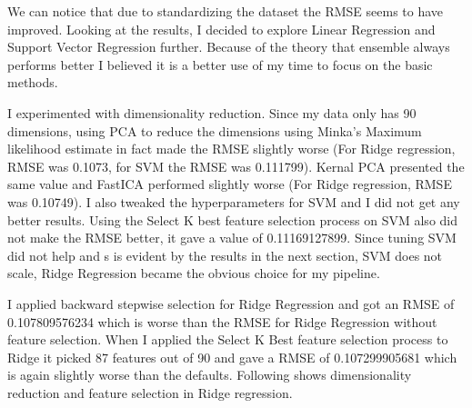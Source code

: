 \documentclass{article} %
\begin{document}
\begin{table}[H]
	\caption{Results after pre-processing - Sampled data set}
	\label{preproc}
	\begin{center}
	\end{center}
\end{table}

We can notice that due to standardizing the dataset the RMSE seems to have improved. Looking at the results, I decided to explore Linear Regression and Support Vector Regression further. Because of the theory that ensemble always performs better I believed it is a better use of my time to focus on the basic methods. 

I experimented with dimensionality reduction. Since my data only has 90 dimensions, using PCA to reduce the dimensions using Minka's Maximum likelihood estimate \cite{minka} in fact made the RMSE slightly worse (For Ridge regression, RMSE was 0.1073, for SVM the RMSE was 0.111799). Kernal PCA presented the same value and FastICA performed slightly worse (For Ridge regression, RMSE was 0.10749). I also tweaked the hyperparameters for SVM and I did not get any better results. Using the Select K best feature selection process on SVM also did not make the RMSE better, it gave a value of 0.11169127899. Since tuning SVM did not help and s is evident by the results in the next section, SVM does not scale, Ridge Regression became the obvious choice for my pipeline. 

I applied backward stepwise selection for Ridge Regression and got an RMSE of 0.107809576234 which is worse than the RMSE for Ridge Regression without feature selection. When I applied the Select K Best feature selection process to Ridge it picked 87 features out of 90 and gave a RMSE of 0.107299905681 which is again slightly worse than the defaults. Following shows dimensionality reduction and feature selection in Ridge regression.
\end{document}
